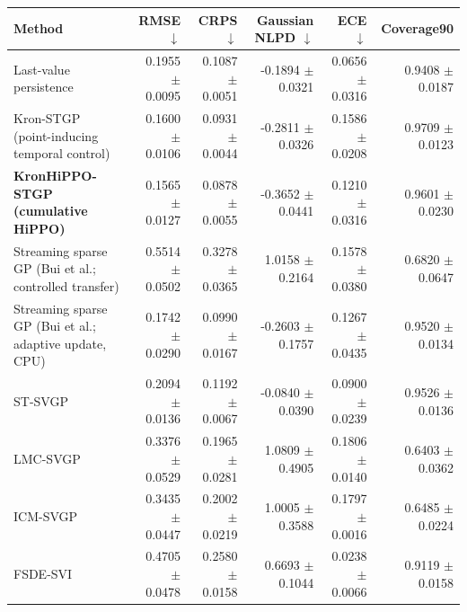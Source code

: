 \begin{tabular}{lrrrrr}
\toprule
Method & RMSE $\downarrow$ & CRPS $\downarrow$ & Gaussian NLPD $\downarrow$ & ECE $\downarrow$ & Coverage90 \\ 
\midrule
Last-value persistence & 0.1955 $\pm$ 0.0095 & 0.1087 $\pm$ 0.0051 & -0.1894 $\pm$ 0.0321 & 0.0656 $\pm$ 0.0316 & 0.9408 $\pm$ 0.0187 \\ 
Kron-STGP (point-inducing temporal control) & 0.1600 $\pm$ 0.0106 & 0.0931 $\pm$ 0.0044 & -0.2811 $\pm$ 0.0326 & 0.1586 $\pm$ 0.0208 & 0.9709 $\pm$ 0.0123 \\ 
\textbf{KronHiPPO-STGP (cumulative HiPPO)} & 0.1565 $\pm$ 0.0127 & 0.0878 $\pm$ 0.0055 & -0.3652 $\pm$ 0.0441 & 0.1210 $\pm$ 0.0316 & 0.9601 $\pm$ 0.0230 \\ 
Streaming sparse GP (Bui et al.; controlled transfer) & 0.5514 $\pm$ 0.0502 & 0.3278 $\pm$ 0.0365 & 1.0158 $\pm$ 0.2164 & 0.1578 $\pm$ 0.0380 & 0.6820 $\pm$ 0.0647 \\ 
Streaming sparse GP (Bui et al.; adaptive update, CPU) & 0.1742 $\pm$ 0.0290 & 0.0990 $\pm$ 0.0167 & -0.2603 $\pm$ 0.1757 & 0.1267 $\pm$ 0.0435 & 0.9520 $\pm$ 0.0134 \\ 
ST-SVGP & 0.2094 $\pm$ 0.0136 & 0.1192 $\pm$ 0.0067 & -0.0840 $\pm$ 0.0390 & 0.0900 $\pm$ 0.0239 & 0.9526 $\pm$ 0.0136 \\ 
LMC-SVGP & 0.3376 $\pm$ 0.0529 & 0.1965 $\pm$ 0.0281 & 1.0809 $\pm$ 0.4905 & 0.1806 $\pm$ 0.0140 & 0.6403 $\pm$ 0.0362 \\ 
ICM-SVGP & 0.3435 $\pm$ 0.0447 & 0.2002 $\pm$ 0.0219 & 1.0005 $\pm$ 0.3588 & 0.1797 $\pm$ 0.0016 & 0.6485 $\pm$ 0.0224 \\ 
FSDE-SVI & 0.4705 $\pm$ 0.0478 & 0.2580 $\pm$ 0.0158 & 0.6693 $\pm$ 0.1044 & 0.0238 $\pm$ 0.0066 & 0.9119 $\pm$ 0.0158 \\ 
\bottomrule
\end{tabular}
